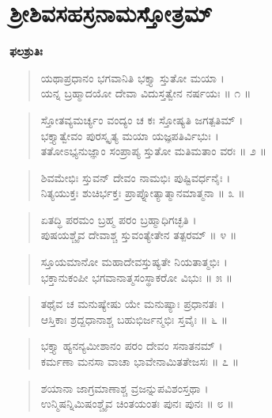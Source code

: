 
\chapter{ಶ್ರೀಶಿವಸಹಸ್ರನಾಮಸ್ತೋತ್ರಮ್}

\begin{center}
\textbf{ಫಲಶ್ರುತಿಃ}
\end{center}

\begin{verse}
ಯಥಾಪ್ರಧಾನಂ ಭಗವಾನಿತಿ ಭಕ್ತ್ಯಾ ಸ್ತುತೋ ಮಯಾ ।\\ಯನ್ನ ಬ್ರಹ್ಮಾದಯೋ ದೇವಾ ವಿದುಸ್ತತ್ವೇನ ನರ್ಷಯಃ \num{॥ ೧ ॥}
\end{verse}

\begin{verse}
ಸ್ತೋತವ್ಯಮರ್ಚ್ಯಂ ವಂದ್ಯಂ ಚ ಕಃ ಸ್ತೋಷ್ಯತಿ ಜಗತ್ಪತಿಮ್ ।\\ಭಕ್ತ್ಯಾತ್ವೇವಂ ಪುರಸ್ಕೃತ್ಯ ಮಯಾ ಯಜ್ಞಪತಿರ್ವಿಭುಃ ।\\ತತೋಽಭ್ಯನುಜ್ಞಾಂ ಸಂಪ್ರಾಪ್ಯ ಸ್ತುತೋ ಮತಿಮತಾಂ ವರಃ \num{॥ ೨ ॥}
\end{verse}

\begin{verse}
ಶಿವಮೇಭಿಃ ಸ್ತುವನ್ ದೇವಂ ನಾಮಭಿಃ ಪುಷ್ಟಿವರ್ಧನೈಃ ।\\ನಿತ್ಯಯುಕ್ತಃ ಶುಚಿರ್ಭಕ್ತಃ ಪ್ರಾಪ್ನೋತ್ಯಾತ್ಮಾನಮಾತ್ಮನಾ \num{॥ ೩ ॥}
\end{verse}

\begin{verse}
ಏತದ್ಧಿ ಪರಮಂ ಬ್ರಹ್ಮ ಪರಂ ಬ್ರಹ್ಮಾಧಿಗಚ್ಛತಿ ।\\ಪುಷಯಶ್ಚೈವ ದೇವಾಶ್ಚ ಸ್ತುವಂತ್ಯೇತೇನ ತತ್ಪರಮ್ \num{॥ ೪ ॥}
\end{verse}

\begin{verse}
ಸ್ತೂಯಮಾನೋ ಮಹಾದೇವಸ್ತುಷ್ಯತೇ ನಿಯತಾತ್ಮಭಿಃ ।\\ಭಕ್ತಾನುಕಂಪೀ ಭಗವಾನಾತ್ಮಸಂಸ್ಥಾಕರೋ ವಿಭುಃ \num{॥ ೫ ॥}
\end{verse}

\begin{verse}
ತಥೈವ ಚ ಮನುಷ್ಯೇಷು ಯೇ ಮನುಷ್ಯಾಃ ಪ್ರಧಾನತಃ ।\\ಆಸ್ತಿಕಾಃ ಶ್ರದ್ದಧಾನಾಶ್ಚ ಬಹುಭಿರ್ಜನ್ಮಭಿಃ ಸ್ತವೈಃ \num{॥ ೬ ॥}
\end{verse}

\begin{verse}
ಭಕ್ತ್ಯಾ ಹ್ಯನನ್ಯಮೀಶಾನಂ ಪರಂ ದೇವಂ ಸನಾತನಮ್ ।\\ಕರ್ಮಣಾ ಮನಸಾ ವಾಚಾ ಭಾವೇನಾಮಿತತೇಜಸಃ \num{॥ ೭ ॥}
\end{verse}

\begin{verse}
ಶಯಾನಾ ಜಾಗ್ರಮಾಣಾಶ್ಚ ವ್ರಜನ್ನುಪವಿಶಂಸ್ತಥಾ ।\\ಉನ್ಮಿಷನ್ನಿಮಿಷಂಶ್ಚೈವ ಚಿಂತಯಂತಃ ಪುನಃ ಪುನಃ \num{॥ ೮ ॥}
\end{verse}

